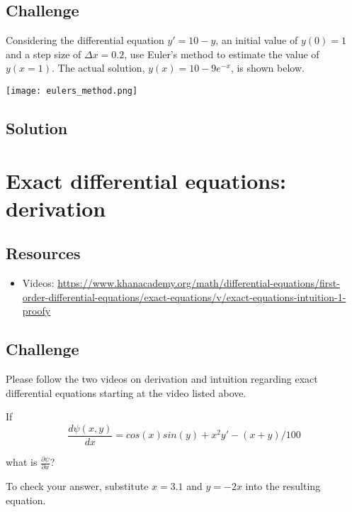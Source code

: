 \subsection*{Challenge}
Considering the differential equation $y'=10-y$, an initial value of $y(0)=1$ and a step size of $\Delta x = 0.2$, use Euler's method to estimate the value of $y(x=1)$. The actual solution, $y(x)=10-9e^{-x}$, is shown below.

\texttt{[image: eulers\_method.png]}

\subsection*{Solution}
\six{}

\timebox




\newpage
\section{Exact differential equations: derivation}

\subsection*{Resources}
\begin{itemize}
    \item Videos: \url{https://www.khanacademy.org/math/differential-equations/first-order-differential-equations/exact-equations/v/exact-equations-intuition-1-proofy}
\end{itemize}

\subsection*{Challenge}
Please follow the two videos on derivation and intuition regarding exact differential equations starting at the video listed above.

If
\begin{equation}
    \frac{d \psi(x,y)}{dx} = cos(x)sin(y) + x^2y' - (x+y)/100
\end{equation}

what is $\displaystyle \frac{\partial \psi}{\partial x}$?

To check your answer, substitute $x=3.1$ and $y=-2x$ into the resulting equation.

